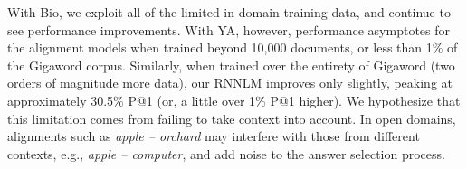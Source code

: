 With Bio, we exploit all of the limited in-domain training data, and continue to see performance improvements.  With YA, however, performance asymptotes for the alignment models when trained beyond 10,000 documents, or less than 1\% of the Gigaword corpus.  Similarly, when trained over the entirety of Gigaword (two orders of magnitude more data), our RNNLM improves only slightly, peaking at approximately 30.5\% P@1 (or, a little over 1\% P@1 higher).  
We hypothesize that this limitation comes from failing to take context into account. 
In open domains, alignments such as {\em apple -- \mbox{orchard}} may interfere with those from different contexts, e.g., {\em apple -- computer}, and add noise to the answer selection process.  



